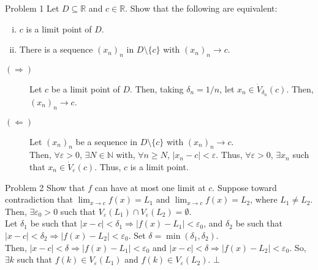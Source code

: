 \documentclass[10pt]{extarticle}
\title{}
\author{}
\date{}
\newcommand{\N}{\mathbb{N}}
\newcommand{\R}{\mathbb{R}}
\begin{document}
  \begin{problem}{Problem 1}
    Let $D\subseteq \R$ and $c\in\R$. Show that the following are equivalent:
    \begin{enumerate}[(i)]
      \item $c$ is a limit point of $D$.
      \item There is a sequence $(x_n)_n$ in $D\setminus \{c\}$ with $(x_n)_n \rightarrow c$.
    \end{enumerate}
    \tcblower
    \begin{description}
      \item[$(\Rightarrow)$] Let $c$ be a limit point of $D$. Then, taking $\delta_n = 1/n$, let $x_n \in \dot{V}_{\delta_n}(c)$. Then, $(x_n)_n \rightarrow c$.
      \item[$(\Leftarrow)$] Let $(x_n)_n$ be a sequence in $D \setminus \{c\}$ with $(x_n)_n \rightarrow c$.\\

        Then, $\forall \varepsilon > 0$, $\exists N\in \N$ with, $ \forall n\geq N$, $|x_n - c| < \varepsilon$. Thus, $\forall \varepsilon > 0$, $\exists x_n$ such that $x_n \in \dot{V}_{\varepsilon}(c)$. Thus, $c$ is a limit point.
    \end{description}
  \end{problem}
  \begin{problem}{Problem 2}
    Show that $f$ can have at most one limit at $c$.
    \tcblower
    Suppose toward contradiction that $\lim_{x\rightarrow c}f(x) = L_1$ and $\lim_{x\rightarrow c}f(x) = L_2$, where $L_1 \neq L_2$. Then, $\exists \varepsilon_{0} > 0$ such that $V_{\varepsilon}(L_1) \cap V_{\varepsilon}(L_2) = \emptyset$.\\

    Let $\delta_1$ be such that $|x - c| < \delta_1 \Rightarrow |f(x) - L_1| < \varepsilon_{0}$, and $\delta_2$ be such that $|x-c| < \delta_2 \Rightarrow |f(x) - L_2| < \varepsilon_0$. Set $\delta = \min(\delta_1,\delta_2)$.\\

    Then, $|x-c| < \delta \Rightarrow |f(x) - L_1| < \varepsilon_0$ and $|x-c| < \delta \Rightarrow |f(x) - L_2| < \varepsilon_0$. So, $\exists k$ such that $f(k)\in V_{\varepsilon}(L_1)$ and $f(k)\in V_{\varepsilon}(L_2)$. $\bot$
  \end{problem}
\end{document}
